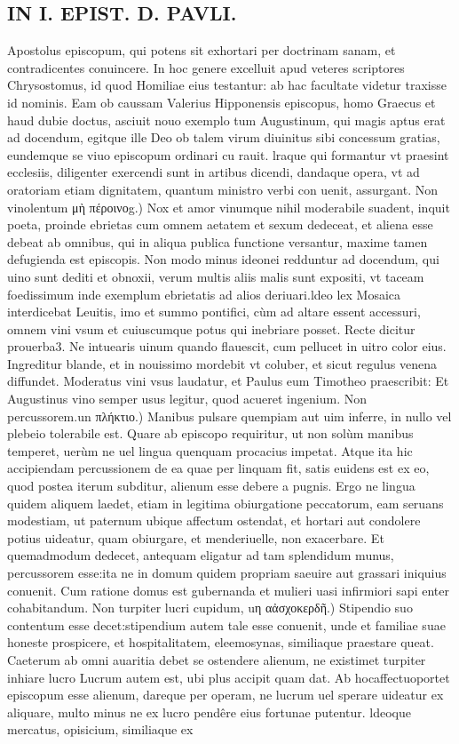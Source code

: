 \documentclass{article}
\begin{document}
\begin{pages}
\section*{IN I. EPIST. D. PAVLI. }
\marginpar{[ p.78 ]}\pstart Apostolus episcopum, qui potens sit exhortari per doctrinam sanam, et contradicentes conuincere. In hoc genere excelluit apud veteres scriptores Chrysostomus, id quod Homiliae eius testantur: ab hac facultate videtur traxisse id nominis. Eam ob caussam Valerius Hipponensis episcopus, homo Graecus et haud dubie doctus, asciuit nouo exemplo tum Augustinum, qui magis aptus erat ad docendum, egitque ille Deo ob talem virum diuinitus sibi concessum gratias, eundemque se viuo episcopum ordinari cu rauit. lraque qui formantur vt praesint ecclesiis, diligenter exercendi sunt in artibus dicendi, dandaque opera, vt ad oratoriam etiam dignitatem, quantum ministro verbi con uenit, assurgant.  \pend\pstart Non vinolentum μὴ πέροινοg.) Nox et amor vinumque nihil moderabile suadent, inquit poeta, proinde ebrietas cum omnem aetatem et sexum dedeceat, et aliena esse debeat ab omnibus, qui in aliqua publica functione versantur, maxime tamen defugienda est episcopis. Non modo minus ideonei redduntur ad docendum, qui uino sunt dediti et obnoxii, verum multis aliis malis sunt expositi, vt taceam foedissimum inde exemplum ebrietatis ad alios deriuari.ldeo lex Mosaica interdicebat Leuitis, imo et summo pontifici, cùm ad altare essent accessuri, omnem vini vsum et cuiuscumque potus qui inebriare posset. Recte dicitur prouerba3. Ne intuearis uinum quando flauescit, cum pellucet in uitro color eius. Ingreditur blande, et in nouissimo mordebit vt coluber, et sicut regulus venena diffundet. Moderatus vini vsus laudatur, et Paulus eum Timotheo praescribit: Et Augustinus vino semper usus legitur, quod acueret ingenium.  \pend\pstart Non percussorem.un πλήκτιο.) Manibus pulsare quempiam aut uim inferre, in nullo vel plebeio tolerabile est. Quare ab episcopo requiritur, ut non solùm manibus temperet, uerùm ne uel lingua quenquam procacius impetat. Atque ita hic accipiendam percussionem de ea quae per linquam fit, satis euidens est ex eo, quod postea iterum subditur, alienum esse debere a pugnis. Ergo ne lingua quidem aliquem laedet, etiam in legitima obiurgatione peccatorum, eam seruans modestiam, ut paternum ubique affectum ostendat, et hortari aut condolere potius uideatur, quam obiurgare, et menderiuelle, non exacerbare. Et quemadmodum dedecet, antequam eligatur ad tam splendidum munus, percussorem esse:ita ne in domum quidem propriam saeuire aut grassari iniquius conuenit. Cum ratione domus est gubernanda et mulieri uasi infirmiori sapi enter cohabitandum.  \pend\pstart Non turpiter lucri cupidum, uη αἀσχοκερδῆ.) Stipendio suo contentum esse decet:stipendium autem tale esse conuenit, unde et familiae suae honeste prospicere, et hospitalitatem, eleemosynas, similiaque praestare queat. Caeterum ab omni auaritia debet se ostendere alienum, ne existimet turpiter inhiare lucro Lucrum autem est, ubi plus accipit quam dat. Ab hocaffectuoportet episcopum esse alienum, dareque per operam, ne lucrum uel sperare uideatur ex aliquare, multo minus ne ex lucro pendêre eius fortunae putentur. ldeoque  mercatus, opisicium, similiaque ex 
\end{pages}
\end{document}
